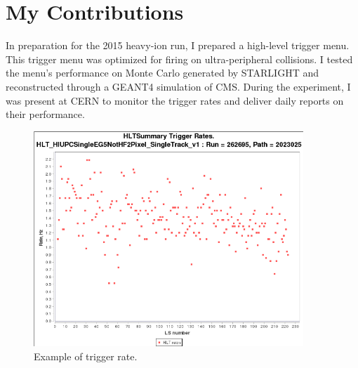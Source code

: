 \section{My Contributions}

In preparation for the 2015 heavy-ion run, I prepared a high-level trigger menu. This trigger menu was optimized for firing on ultra-peripheral collisions. I tested the menu's performance on Monte Carlo generated by STARLIGHT and reconstructed through a GEANT4 simulation of CMS. During the experiment, I was present at CERN to monitor the trigger rates and deliver daily reports on their performance. 

\begin{figure}[h!]
\begin{centering}
\includegraphics[width=4in]{Chapter5/importfigs/triggerRateExample.png}
\par\end{centering}
\caption{Example of trigger rate. \label{fig:trigRate}}
\end{figure}

